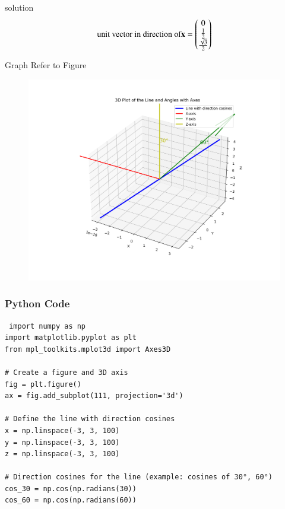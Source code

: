 \documentclass{beamer}
\begin{document}
\begin{frame}{solution}
\begin{align}
    \text{unit vector in direction of} \mathbf{x}= \begin{pmatrix}
                                                0
                                                \\
                                                 \frac{1}{2}
                                                  \\
                                                  \frac{\sqrt{3}}{2}
                                                  \end{pmatrix}
\end{align}
\end{frame}
\begin{frame}{Graph}
   Refer to Figure

\begin{figure}[H]
\begin{center}
\includegraphics[width=0.6\columnwidth]{../figs/graph2.png}
\end{center}
\caption{}
\label{fig:Fig}
\end{figure}  
\end{frame}



\begin{frame}[fragile]
    \frametitle{Python Code}
    \begin{lstlisting}
 import numpy as np
import matplotlib.pyplot as plt
from mpl_toolkits.mplot3d import Axes3D

# Create a figure and 3D axis
fig = plt.figure()
ax = fig.add_subplot(111, projection='3d')

# Define the line with direction cosines
x = np.linspace(-3, 3, 100)
y = np.linspace(-3, 3, 100)
z = np.linspace(-3, 3, 100)

# Direction cosines for the line (example: cosines of 30°, 60°)
cos_30 = np.cos(np.radians(30))
cos_60 = np.cos(np.radians(60))


\end{lstlisting}
\end{frame}
\end{document}
